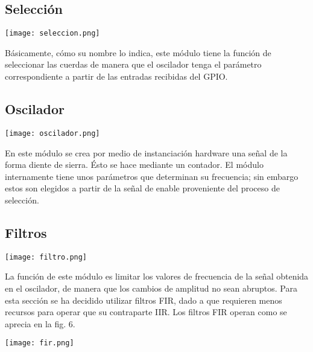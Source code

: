 \documentclass[12pt,journal]{IEEEtran}
\begin{document}
\subsection*{Selecci\'on}
\begin{center}
	\texttt{[image: seleccion.png]}
\end{center}

B\'asicamente, c\'omo su nombre lo indica, este m\'odulo tiene la funci\'on de seleccionar las cuerdas de manera que el oscilador tenga el par\'ametro correspondiente a partir de las entradas recibidas del GPIO.

\subsection*{Oscilador}
\begin{center}
	\texttt{[image: oscilador.png]}
\end{center}

En este m\'odulo se crea por medio de instanciaci\'on hardware una señal de la forma diente de sierra. \'Esto se hace mediante un contador. El m\'odulo internamente tiene unos par\'ametros que determinan su frecuencia; sin embargo estos son elegidos a partir de la señal de enable proveniente del proceso de selecci\'on. 

\subsection*{Filtros}
\begin{center}
	\texttt{[image: filtro.png]}
\end{center}

La funci\'on de este m\'odulo es limitar los valores de frecuencia de la señal obtenida en el oscilador, de manera que los cambios de amplitud no sean abruptos. Para esta secci\'on se ha decidido utilizar filtros FIR, dado a que requieren menos recursos para operar que su contraparte IIR. Los filtros FIR operan como se aprecia en la fig. 6. \par


\begin{center}
	\texttt{[image: fir.png]}
\end{center}
\end{document}
